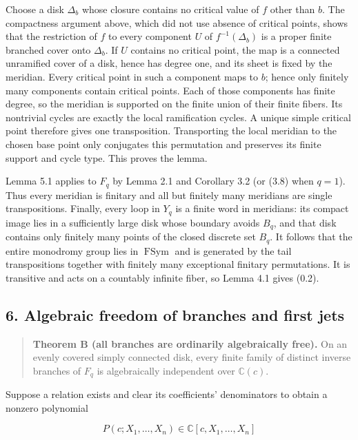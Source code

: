 Choose a disk \(\Delta_b\) whose closure contains no critical value of
\(f\) other than \(b\). The compactness argument above,
which did not use absence of critical points, shows that the restriction of
\(f\) to every component \(U\) of \(f^{-1}(\Delta_b)\) is a proper finite
branched cover onto \(\Delta_b\). If \(U\) contains no critical point, the
map is a connected unramified cover of a disk, hence has degree one, and its
sheet is fixed by the meridian. Every critical point in such a component
maps to \(b\); hence only finitely many components contain critical points.
Each of those components has finite degree, so the meridian is supported on
the finite union of their finite fibers. Its nontrivial cycles are exactly
the local ramification cycles. A unique simple critical point therefore
gives one transposition. Transporting the local meridian to the chosen base
point only conjugates this permutation and preserves its finite support and
cycle type. This proves the lemma.

Lemma 5.1 applies to \(F_q\) by Lemma 2.1 and Corollary 3.2 (or (3.8) when
\(q=1\)). Thus every meridian is finitary and all but finitely many
meridians are single transpositions. Finally, every loop in \(Y_q\) is a
finite word in meridians: its compact image lies in a sufficiently large
disk whose boundary avoids \(B_q\), and that disk contains only finitely
many points of the closed discrete set \(B_q\). It follows that the entire
monodromy group lies in \(\operatorname{FSym}\) and is generated by the
tail transpositions together with finitely many exceptional finitary
permutations. It is transitive and acts on a countably infinite fiber, so
Lemma 4.1 gives (0.2).

\subsection{6. Algebraic freedom of branches and first jets}

\begin{quote}
\textbf{Theorem B (all branches are ordinarily algebraically free).} On an
evenly covered simply connected disk, every finite family of distinct
inverse branches of \(F_q\) is algebraically independent over
\(\mathbb C(c)\).
\end{quote}

Suppose a relation exists and clear its coefficients' denominators to obtain
a nonzero polynomial

\[
 P(c;X_1,\ldots,X_n)\in\mathbb C[c,X_1,\ldots,X_n]
\]

